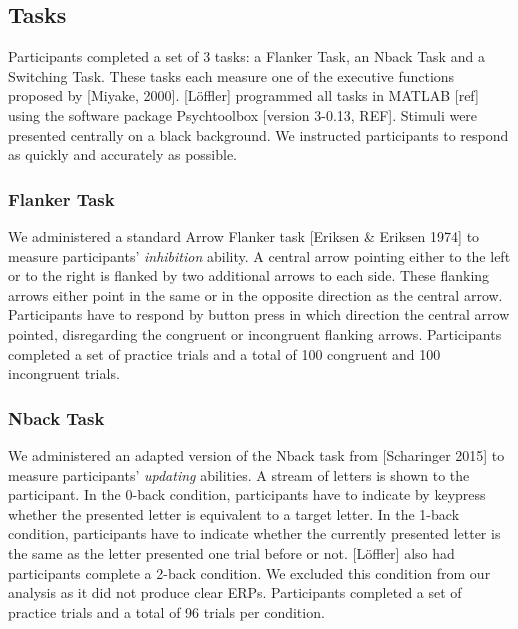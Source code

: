 \documentclass[
  man,floatsintext]{apa7}
\begin{document}
\hypertarget{tasks}{%
\subsection{Tasks}\label{tasks}}

Participants completed a set of 3 tasks: a Flanker Task, an Nback Task and a Switching Task. These tasks each measure one of the executive functions proposed by {[}Miyake, 2000{]}. {[}Löffler{]} programmed all tasks in MATLAB {[}ref{]} using the software package Psychtoolbox {[}version 3-0.13, REF{]}. Stimuli were presented centrally on a black background. We instructed participants to respond as quickly and accurately as possible.

\hypertarget{flanker-task}{%
\subsubsection{Flanker Task}\label{flanker-task}}

We administered a standard Arrow Flanker task {[}Eriksen \& Eriksen 1974{]} to measure participants' \emph{inhibition} ability. A central arrow pointing either to the left or to the right is flanked by two additional arrows to each side. These flanking arrows either point in the same or in the opposite direction as the central arrow. Participants have to respond by button press in which direction the central arrow pointed, disregarding the congruent or incongruent flanking arrows. Participants completed a set of practice trials and a total of 100 congruent and 100 incongruent trials.

\hypertarget{nback-task}{%
\subsubsection{Nback Task}\label{nback-task}}

We administered an adapted version of the Nback task from {[}Scharinger 2015{]} to measure participants' \emph{updating} abilities. A stream of letters is shown to the participant. In the 0-back condition, participants have to indicate by keypress whether the presented letter is equivalent to a target letter. In the 1-back condition, participants have to indicate whether the currently presented letter is the same as the letter presented one trial before or not. {[}Löffler{]} also had participants complete a 2-back condition. We excluded this condition from our analysis as it did not produce clear ERPs. Participants completed a set of practice trials and a total of 96 trials per condition.
\end{document}
